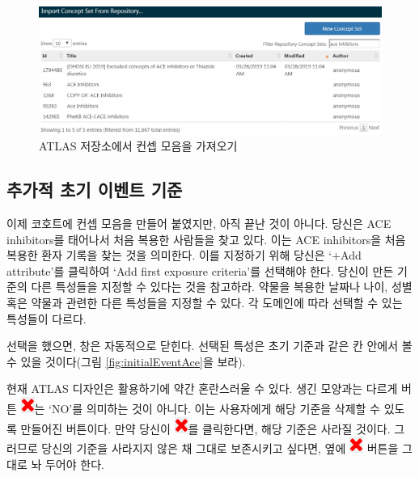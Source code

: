 \documentclass[11pt]{book}
\theoremstyle{definition}
\theoremstyle{definition}
\theoremstyle{definition}
\theoremstyle{remark}
\let\BeginKnitrBlock\begin \let\EndKnitrBlock\end
\begin{document}
\begin{figure}

{\centering \includegraphics[width=1\linewidth]{images/Cohorts/ATLAS-findingyourconcept} 

}

\caption{ATLAS 저장소에서 컨셉 모음을 가져오기}\label{fig:ATLASfindyourconcept}
\end{figure}

\subsection{추가적 초기 이벤트 기준}\label{---}

이제 코호트에 컨셉 모음을 만들어 붙였지만, 아직 끝난 것이 아니다. 당신은
ACE inhibitors를 태어나서 처음 복용한 사람들을 찾고 있다. 이는 ACE
inhibitors을 처음 복용한 환자 기록을 찾는 것을 의미한다. 이를 지정하기
위해 당신은 `+Add attribute'를 클릭하여 `Add first exposure criteria'를
선택해야 한다. 당신이 만든 기준의 다른 특성들을 지정할 수 있다는 것을
참고하라. 약물을 복용한 날짜나 나이, 성별 혹은 약물과 관련한 다른
특성들을 지정할 수 있다. 각 도메인에 따라 선택할 수 있는 특성들이
다르다.

선택을 했으면, 창은 자동적으로 닫힌다. 선택된 특성은 초기 기준과 같은 칸
안에서 볼 수 있을 것이다(그림 \ref{fig:initialEventAce}을 보라).

\BeginKnitrBlock{rmdimportant}
현재 ATLAS 디자인은 활용하기에 약간 혼란스러울 수 있다. 생긴 모양과는
다르게 버튼 \includegraphics{images/Cohorts/redX.png}는 `NO'를 의미하는
것이 아니다. 이는 사용자에게 해당 기준을 삭제할 수 있도록 만들어진
버튼이다. 만약 당신이 \includegraphics{images/Cohorts/redX.png}를
클릭한다면, 해당 기준은 사라질 것이다. 그러므로 당신의 기준을 사라지지
않은 채 그대로 보존시키고 싶다면, 옆에
\includegraphics{images/Cohorts/redX.png} 버튼을 그대로 놔 두어야 한다.
\EndKnitrBlock{rmdimportant}
\end{document}
